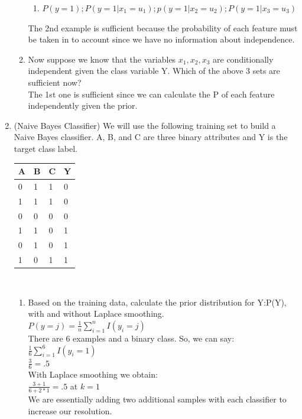 \documentclass[12pt,letterpaper]{article}
\begin{document}
\begin{enumerate}
\begin{enumerate}
\begin{enumerate}
			\item $P(y = 1); P(y = 1| x_{1} = u_{1}); p(y = 1 | x_{2} = u_{2}); P(y = 1 | x_{3} = u_{3})$ \\
		\end{enumerate} 
		The 2nd example is sufficient because the probability of each feature must be taken in to account since we have no information about independence.\\
		\item Now suppose we know that the variables $x_{1},x_{2},x_{3}$ are conditionally independent given the class variable Y. Which of the above 3 sets are sufficient now? \\
		The 1st one is sufficient since we can calculate the P of each feature independently given the prior.\\
	\end{enumerate} 
	\item (Naive Bayes Classifier) We will use the following training set to build a Naive Bayes classifier. A, B, and C are three binary attributes and Y is the target class label. \\[10mm]
	\centering
	\begin{tabular}{| l | l | l | l |} 
	\hline
	A & B & C & Y \\ \hline 
	0 & 1 & 1 & 0 \\ \hline
	1 & 1 & 1 & 0 \\ \hline
	0 & 0 & 0 & 0 \\ \hline
	1 & 1 & 0 & 1 \\ \hline
	0 & 1 & 0 & 1 \\ \hline
	1 & 0 & 1 & 1 \\ \hline 
	\end{tabular} \\[15mm]
	\begin{enumerate} 
		\item Based on the training data, calculate the prior distribution for Y:P(Y), with and without Laplace smoothing. \\
		$P(y = j) = \frac{1}{n} \sum_{i=1}^{n} I(y_{i} = j)$ \\
		There are 6 examples and a binary class. So, we can say: \\
		$\frac{1}{6} \sum_{i=1}^{6} I(y_{i} = 1)$ \\
		$\frac{3}{6} = .5$ \\
		With Laplace smoothing we obtain: \\
		$\frac{3+1}{6+2*1} = .5$ at $ k = 1$ \\ 
		We are essentially adding two additional samples with each classifier to increase our resolution. \\ 

\end{enumerate}
\end{enumerate}
\end{document}
